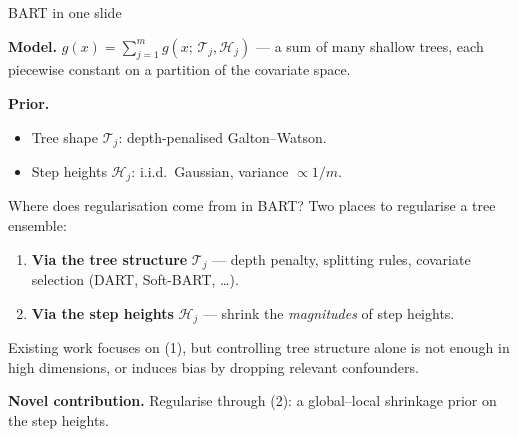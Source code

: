 \documentclass[10pt,aspectratio=169]{beamer}
\newcommand{\T}{\mathcal{T}}
\newcommand{\Hh}{\mathcal{H}}
\begin{document}
\begin{frame}{BART in one slide}
\vspace{-0.2em}

\textbf{Model.} $g(x) = \sum_{j=1}^{m} g(x;\, \T_j, \Hh_j)$ --- a sum of many shallow trees, each piecewise constant on a partition of the covariate space.

\vspace{0.3cm}

\textbf{Prior.}
\begin{itemize}
  \item Tree shape $\T_j$: depth-penalised Galton--Watson.
  \item Step heights $\Hh_j$: i.i.d.\ Gaussian, variance $\propto 1/m$.
\end{itemize}

\end{frame}

\begin{frame}{Where does regularisation come from in BART?}
Two places to regularise a tree ensemble:

\bigskip

\begin{enumerate}
  \item \textbf{Via the tree structure} $\T_j$ --- depth penalty, splitting rules, covariate selection (DART, Soft-BART, \ldots).
  \medskip
  \item \textbf{Via the step heights} $\Hh_j$ --- shrink the \emph{magnitudes} of step heights.
\end{enumerate}

\bigskip

Existing work focuses on (1), but controlling tree structure alone is not enough in high dimensions, or induces bias by dropping relevant confounders.
\bigskip

\textbf{Novel contribution.} Regularise through (2): a global--local shrinkage prior on the step heights.
\end{frame}
\end{document}

